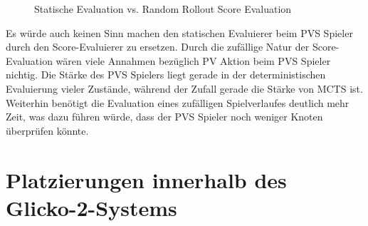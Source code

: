\vspace*{0.2cm}
\begin{figure}[!ht]
    \centering
    \caption[Statische Evaluation vs. Score Evaluation]{Statische Evaluation vs. Random Rollout Score Evaluation}
    \label{fig:greedy-static-greedy-score-comparison}
\end{figure}
\vspace*{0.1cm}

Es würde auch keinen Sinn machen den statischen Evaluierer beim \ac{PVS} Spieler durch den Score-Evaluierer zu ersetzen. Durch die zufällige Natur der Score-Evaluation wären viele Annahmen bezüglich \ac{PV} Aktion beim \ac{PVS} Spieler nichtig. Die Stärke des \ac{PVS} Spielers liegt gerade in der deterministischen Evaluierung vieler Zustände, während der Zufall gerade die Stärke von \ac{MCTS} ist. Weiterhin benötigt die Evaluation eines zufälligen Spielverlaufes deutlich mehr Zeit, was dazu führen würde, dass der \ac{PVS} Spieler noch weniger Knoten überprüfen könnte.

\pagebreak

\section{Platzierungen innerhalb des Glicko-2-Systems}

